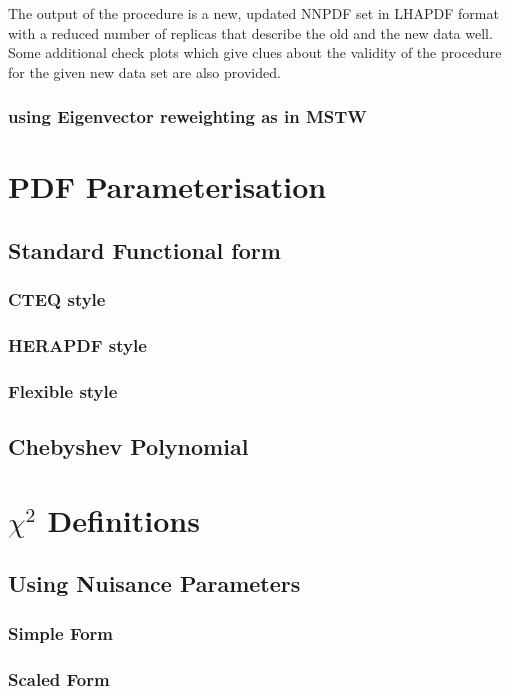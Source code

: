 \documentclass[11pt,a4paper]{article}
\begin{document}
The output of the procedure is a new, updated NNPDF set in LHAPDF format with a reduced number of replicas that describe the old and the new data well. 
Some additional check plots which give clues about the validity of the procedure for the given new data set are also provided.
\subsubsection{using Eigenvector reweighting as in MSTW}
 
\section{PDF Parameterisation}
\label{sec:pdfparam}
\subsection{Standard Functional form}
\subsubsection{CTEQ style}
\subsubsection{HERAPDF style}
\subsubsection{Flexible style}
\subsection{Chebyshev Polynomial}

\section{$\chi^2$ Definitions}
\label{sec:chi2}
\subsection{Using Nuisance Parameters}
\subsubsection{Simple Form}

\subsubsection{Scaled Form}
\end{document}
